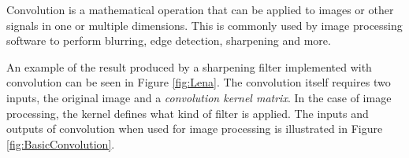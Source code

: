 Convolution is a mathematical operation that can be applied to images or other signals in one or multiple dimensions.
This is commonly used by image processing software to perform blurring, edge detection, sharpening and more.

An example of the result produced by a sharpening filter implemented with convolution can be seen in Figure \ref{fig:Lena}.
The convolution itself requires two inputs, the original image and a \textit{convolution kernel matrix}.
In the case of image processing, the kernel defines what kind of filter is applied.
The inputs and outputs of convolution when used for image processing is illustrated in Figure \ref{fig:BasicConvolution}.


